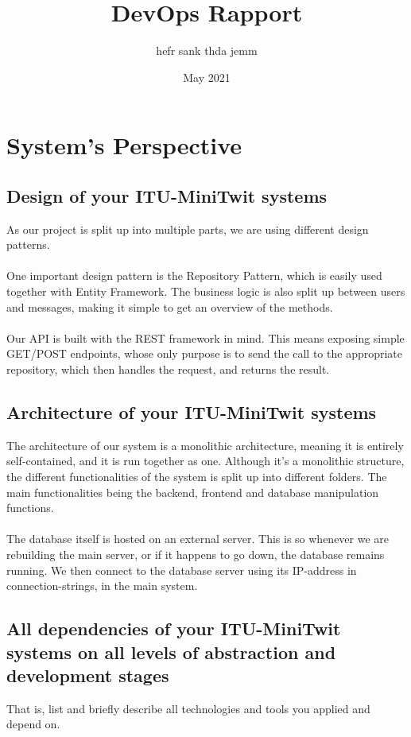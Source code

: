 \documentclass{article}
\title{DevOps Rapport}
\author{hefr sank thda jemm}
\date{May 2021}
\begin{document}
\maketitle
\newpage
\tableofcontents
\newpage

\section{System's Perspective}

\subsection{Design of your ITU-MiniTwit systems}
As our project is split up into multiple parts, we are using different design patterns.
\\\\
One important design pattern is the Repository Pattern, which is easily used together with Entity Framework. The business logic is also split up between users and messages, making it simple to get an overview of the methods.
\\\\
Our API is built with the REST framework in mind. This means exposing simple GET/POST endpoints, whose only purpose is to send the call to the appropriate repository, which then handles the request, and returns the result.

\subsection{Architecture of your ITU-MiniTwit systems}
The architecture of our system is a monolithic architecture, meaning it is entirely self-contained, and it is run together as one. Although it's a monolithic structure, the different functionalities of the system is split up into different folders. The main functionalities being the backend, frontend and database manipulation functions.
\\\\
The database itself is hosted on an external server. This is so whenever we are rebuilding the main server, or if it happens to go down, the database remains running. We then connect to the database server using its IP-address in connection-strings, in the main system.

\subsection{All dependencies of your ITU-MiniTwit systems on all levels of abstraction and development stages}
That is, list and briefly describe all technologies and tools you applied and depend on.
\end{document}

